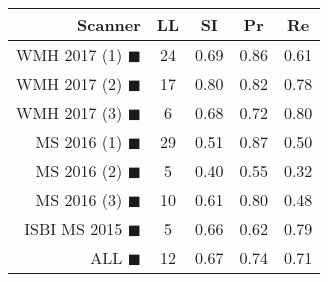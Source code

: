 \begin{tabular}{rcccc}
\toprule
Scanner & LL & SI & Pr & Re \\
\midrule
WMH 2017 (1) {\color[rgb]{ 1.00 0.00 0.00}$\blacksquare$} & 24 & 0.69 & 0.86 & 0.61 \\
WMH 2017 (2) {\color[rgb]{ 1.00 0.50 0.00}$\blacksquare$} & 17 & 0.80 & 0.82 & 0.78 \\
WMH 2017 (3) {\color[rgb]{ 1.00 0.80 0.00}$\blacksquare$} & 6 & 0.68 & 0.72 & 0.80 \\
MS  2016 (1) {\color[rgb]{ 0.20 0.80 0.00}$\blacksquare$} & 29 & 0.51 & 0.87 & 0.50 \\
MS  2016 (2) {\color[rgb]{ 0.00 0.40 1.00}$\blacksquare$} & 5 & 0.40 & 0.55 & 0.32 \\
MS  2016 (3) {\color[rgb]{ 0.60 0.00 1.00}$\blacksquare$} & 10 & 0.61 & 0.80 & 0.48 \\
ISBI MS 2015 {\color[rgb]{ 1.00 0.00 1.00}$\blacksquare$} & 5 & 0.66 & 0.62 & 0.79 \\
\midrule
ALL {\color[rgb]{ 1.00 1.00 1.00}$\blacksquare$} & 12 & 0.67 & 0.74 & 0.71 \\
\bottomrule
\end{tabular}